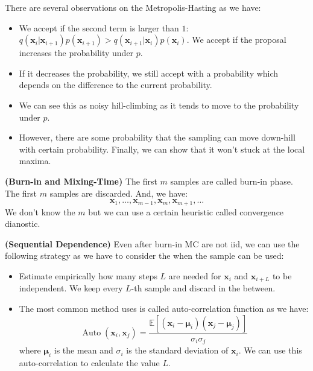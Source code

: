 \begin{remark}
    There are several observations on the Metropolis-Hasting as we have:
    \begin{itemize}
        \item We accept if the second term is larger than $1$: $q(\boldsymbol x_i | \boldsymbol x_{i+1})p(\boldsymbol x_{i+1}) > q(\boldsymbol x_{i+1} | \boldsymbol x_i)p(\boldsymbol x_i)$. We accept if the proposal increases the probability under $p$. 
        \item If it decreases the probability, we still accept with a probability which depends on the difference to the current probability. 
        \item We can see this as noisy hill-climbing as it tends to move to the probability under $p$. 
        \item However, there are some probability that the sampling can move down-hill with certain probability. Finally, we can show that it won't stuck at the local maxima. 
    \end{itemize}
\end{remark}

\begin{definition}{\textbf{(Burn-in and Mixing-Time)}}
    The first $m$ samples are called burn-in phase. The first $m$ samples are discarded. And, we have:
    \begin{equation*}
        \boldsymbol x_1,\dots,\boldsymbol x_{m-1},\boldsymbol x_m,\boldsymbol x_{m+1},\dots
    \end{equation*}
    We don't know the $m$ but we can use a certain heuristic called convergence dianostic. 
\end{definition}

\begin{definition}{\textbf{(Sequential Dependence)}}
    Even after burn-in MC are not iid, we can use the following strategy as we have to consider the when the sample can be used:
    \begin{itemize}
        \item Estimate empirically how many steps $L$ are needed for $\boldsymbol x_i$ and $\boldsymbol x_{i+L}$ to be independent. We keep every $L$-th sample and discard in the between. 
        \item The most common method uses is called auto-correlation function as we have:
        \begin{equation*}
            \operatorname{Auto}(\boldsymbol x_i, \boldsymbol x_j) = \frac{\mathbb{E}[(\boldsymbol x_i - \boldsymbol \mu_i)(\boldsymbol x_j- \boldsymbol \mu_j)]}{\sigma_i\sigma_j}
        \end{equation*}
        where $\boldsymbol \mu_i$ is the mean and $\sigma_i$ is the standard deviation of $\boldsymbol x_i$. We can use this auto-correlation to calculate the value $L$. 
    \end{itemize} 
\end{definition}

